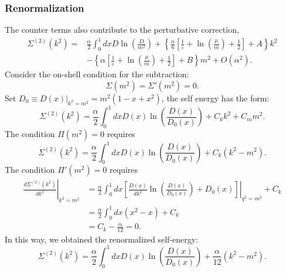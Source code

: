 \subsubsection*{Renormalization}
 
The counter terms also contribute to the perturbative correction,
\begin{equation*}
\begin{aligned}
	\Sigma^{(2)}\left(k^{2}\right) 
	=& \frac{\alpha}{2} \int_{0}^{1} dx D \ln\left(\frac{D}{m^{2}}\right) 
	+\left\{\frac{\alpha}{6}\left[\frac{1}{\varepsilon}+\ln\left(\frac{\mu}{m}\right)+\frac{1}{2}\right]+A\right\} k^{2} \\
	&-\left\{\alpha\left[\frac{1}{\varepsilon}+\ln\left(\frac{\mu}{m}\right)+\frac{1}{2}\right]+B\right\} m^{2}+O\left(\alpha^{2}\right) .
\end{aligned}
\end{equation*}
Consider the on-shell condition for the subtraction:
\begin{equation}
	\Sigma(m^2) = \Sigma'(m^2)=0.
\end{equation}
Set $D_0 \equiv D(x)|_{k^2=m^2}=m^2(1-x+x^2)$, the self energy has the form:
\begin{equation}
	\Sigma^{(2)}(k^2)=\frac{\alpha}{2} \int_0^1dx D(x)\ln\left(\frac{D(x)}{D_0(x)}\right) + C_k k^2+C_m m^2.
\end{equation}
The condition $\Pi(m^2) =0$ requires
\begin{equation*}
	\Sigma^{(2)}(k^2)=\frac{\alpha}{2} \int_0^1dx D(x)\ln\left(\frac{D(x)}{D_0(x)}\right) + C_k (k^2-m^2).
\end{equation*}
The condition $\Pi'(m^2)=0$ requires
\begin{equation*}
\begin{aligned}
	\left.\frac{d\Sigma^{(2)}(k^2)}{dk^2}\right|_{k^2=m^2}
	&=\frac{\alpha}{2} \int_0^1dx \left.\left[
	\frac{D(x)}{dk^2}\ln\left(\frac{D(x)}{D_0(x)}\right)+D_0(x)
	\right]\right|_{q^2=m^2} + C_k  \\
	&= \frac{\alpha}{2}\int_0^1dx (x^2-x) + C_k \\
	&= C_k-\frac{\alpha}{12} = 0.
\end{aligned}
\end{equation*}
In this way, we obtained the renormalized self-energy:
\begin{equation}
	\Sigma^{(2)}(k^2)=\frac{\alpha}{2} \int_0^1dx D(x)\ln\left(\frac{D(x)}{D_0(x)}\right) + \frac{\alpha}{12}(k^2-m^2).
\end{equation}

